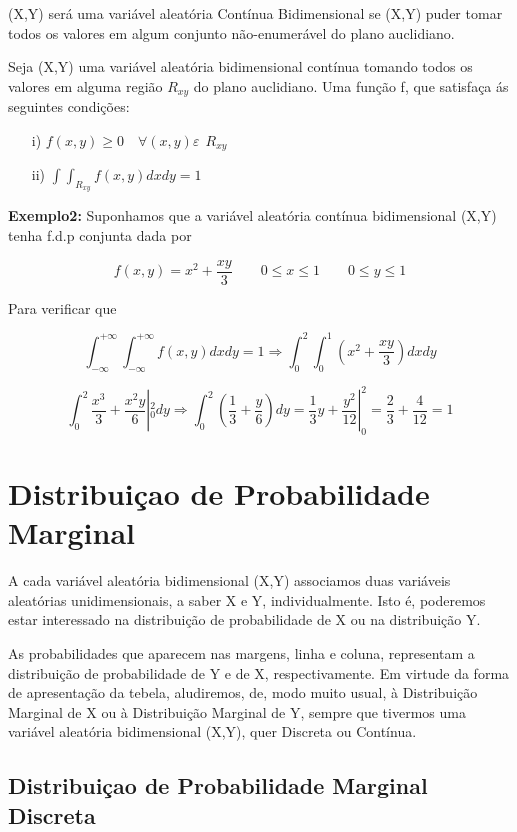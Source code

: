 \documentclass[a4paper,12pt]{report}
\begin{document}
{(X,Y) será uma variável aleatória Contínua Bidimensional se (X,Y)
puder tomar todos os valores em algum conjunto não-enumerável do
plano auclidiano.\vskip0.3cm

Seja (X,Y) uma variável aleatória bidimensional contínua tomando
todos os valores em alguma região $R_{xy}$ do plano auclidiano.
Uma função f, que satisfaça ás seguintes condições:
 \begin{enumerate}
 \item[{i})]  $ f(x,y) \geq 0  \quad \forall (x,y) \varepsilon \ \ R_{xy}$
 \item[{ii})] $ \int\int_{R_{xy}} f(x,y)dxdy = 1 $
\end{enumerate}

{\bf Exemplo2:} Suponhamos que a variável aleatória contínua
bidimensional (X,Y) tenha f.d.p conjunta dada por

$$
f(x,y)= x^{2}+\frac{xy}{3} \quad \quad 0\leq x \leq 1 \quad \quad
0\leq y \leq 1
$$

Para verificar que

$$
\int_{-\infty}^{+\infty}\int_{-\infty}^{+\infty}f(x,y)dxdy = 1
\Longrightarrow \int_{0}^{2}\int_{0}^{1}\left( x^{2}+\frac{xy}{3}
\right)dxdy
$$

$$
\int_{0}^{2}\frac{x^{3}}{3}+\frac{x^{2}y}{6}|^{2}_{0}dy
\Longrightarrow \int_{0}^{2}\left(\frac{1}{3}+\frac{y}{6}
\right)dy = \frac{1}{3}y+\frac{y^{2}}{12}|^{2}_{0} =
\frac{2}{3}+\frac{4}{12}=1
$$

\section{Distribuiçao de Probabilidade Marginal}

A cada variável aleatória  bidimensional (X,Y) associamos duas
variáveis aleatórias unidimensionais, a saber X e Y,
individualmente. Isto é, poderemos estar interessado na
distribuição de probabilidade de X ou na distribuição
Y.\vskip0.3cm

As probabilidades que aparecem nas margens, linha e coluna,
representam a distribuição de probabilidade de Y e de X,
respectivamente. Em virtude da forma de apresentação da tebela,
aludiremos, de, modo muito usual, à Distribuição Marginal de X ou
à Distribuição Marginal de Y, sempre que tivermos uma variável
aleatória bidimensional (X,Y), quer Discreta ou Contínua.


\subsection{Distribuiçao de Probabilidade Marginal Discreta}

}
\end{document}
